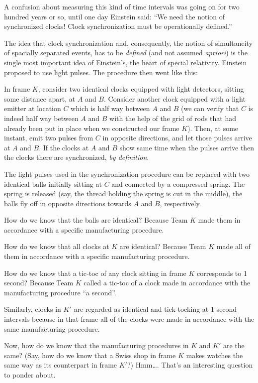 \documentclass[twocolumn,preprintnumbers,amsmath,amssymb,final]{revtex4}
\begin{document}
A confusion about measuring this kind of time intervals was going on for two hundred
years or so, until one day Einstein said: ``We need the notion of synchronized clocks!
Clock synchronization must be operationally defined.''

The idea that clock synchronization and, consequently, the notion of simultaneity of 
spacially separated events, has to be {\it defined} (and not assumed {\it apriori}) is 
the single most important idea of Einstein's, the heart of special relativity. Einstein 
proposed to use light pulses. The procedure then went like this: 

In frame $K$, consider two identical clocks equipped with light detectors, sitting 
some distance apart, at $A$ and $B$. Consider another clock equipped with a light 
emitter at location $C$ which is half way 
between $A$ and $B$ (we can verify that $C$ is indeed half way between $A$ 
and $B$ with the help of the grid 
of rods that had already been put in place when we constructed our frame $K$).  
Then, at some instant, emit two 
pulses from $C$ in opposite directions, and let those pulses arrive at $A$ and $B$. 
If the clocks at $A$ and $B$ show same time when the pulses arrive then the clocks 
there are synchronized, {\it by definition}.

The light pulses used in the synchronization procedure can be replaced with two 
identical balls initially sitting at $C$ and connected by a compressed spring. The 
spring is released (say, the thread holding the spring is cut in the middle), the balls 
fly off in opposite directions towards $A$ and $B$, respectively.   

How do we know that the balls are identical? Because Team $K$ made them in 
accordance with a specific manufacturing procedure.

How do we know that all clocks at $K$ are identical? Because Team $K$ made 
all of them in accordance with a specific manufacturing procedure.

How do we know that a tic-toc of any clock sitting in frame $K$ corresponds to 
1 second? Because Team $K$ called a tic-toc of a clock made in accordance with 
the manufacturing procedure ``a second''. 

Similarly, clocks in $K'$ are regarded as identical and tick-tocking at 1 second 
intervals because in that frame all of the clocks were made in accordance with 
the same manufacturing procedure.


Now, how do we know that the manufacturing procedures in $K$ and $K'$ are the same? 
(Say, how do we know that a Swiss shop in frame $K$ makes watches the same way as its 
counterpart in frame $K'$?) Hmm\dots. That's an interesting question to ponder about.
\end{document}
